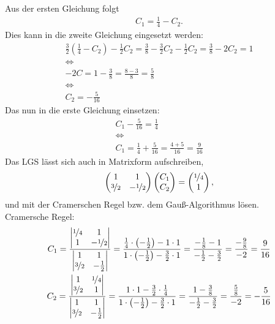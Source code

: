 \documentclass[11pt,a4paper,DIV=12]{scrartcl}
\begin{document}
%
Aus der ersten Gleichung folgt
%
\begin{gather}
	C_1=\frac{1}{4}-C_2.
\end{gather}
%
Dies kann in die zweite Gleichung eingesetzt werden:
%
%
\begin{gather}
	\frac{3}{2}(\frac{1}{4}-C_2)-\frac{1}{2}C_2=\frac{3}{8}-\frac{3}{2}C_2-\frac{1}{2}C_2=\frac{3}{8}-2C_2=1\\
	\Longleftrightarrow\\
	-2C=1-\frac{3}{8}=\frac{8-3}{8}=\frac{5}{8}\\
	\Longleftrightarrow\nonumber\\
	C_2=-\frac{5}{16}
\end{gather}
%
%
Das nun in die erste Gleichung einsetzen:
%
\begin{gather}
	C_1-\frac{5}{16}=\frac{1}{4}\\
	\Longleftrightarrow\nonumber\\
	C_1=\frac{1}{4}+\frac{5}{16}=\frac{4+5}{16}=\frac{9}{16}
\end{gather}
%
Das LGS lässt sich auch in Matrixform aufschreiben,
%
%
\begin{gather}
	\begin{pmatrix}
		1 & 1 \\
		\nicefrac{3}{2} & -\nicefrac{1}{2}
	\end{pmatrix}
	\begin{pmatrix}
		C_1 \\
		C_2
	\end{pmatrix}
	=
	\begin{pmatrix}
		\nicefrac{1}{4} \\
		1
	\end{pmatrix},
\end{gather}
%
%
und mit der Cramerschen Regel bzw. dem Gauß-Algorithmus lösen.\\
%
Cramersche Regel:
%
\begin{gather}
	C_1=
	\frac{
		\begin{vmatrix}
			\nicefrac{1}{4} & 1\\
			1 & -\nicefrac{1}{2}
		\end{vmatrix}
	}
	{
		\begin{vmatrix}
			1 & 1 \\
			\nicefrac{3}{2} & -\frac{1}{2}
		\end{vmatrix}
	}
	=
	\frac{\frac{1}{4}\cdot\left(-\frac{1}{2}\right)-1\cdot 1}
	{1\cdot\left(-\frac{1}{2}\right)-\frac{3}{2}\cdot1}
	=\frac{-\frac{1}{8}-1}{-\frac{1}{2}-\frac{3}{2}}=\frac{-\frac{9}{8}}{-2}=\frac{9}{16}\\
	C_2=
	\frac{
		\begin{vmatrix}
			1 & \nicefrac{1}{4}\\
			\nicefrac{3}{2} & 1
		\end{vmatrix}
	}
	{
		\begin{vmatrix}
			1 & 1 \\
			\nicefrac{3}{2} & -\frac{1}{2}
		\end{vmatrix}
	}
	=
	\frac{1\cdot 1-\frac{3}{2}\cdot\frac{1}{4}}
	{1\cdot\left(-\frac{1}{2}\right)-\frac{3}{2}\cdot1}
	=\frac{1-\frac{3}{8}}{-\frac{1}{2}-\frac{3}{2}}=\frac{\frac{5}{8}}{-2}=-\frac{5}{16}
\end{gather}
\end{document}
